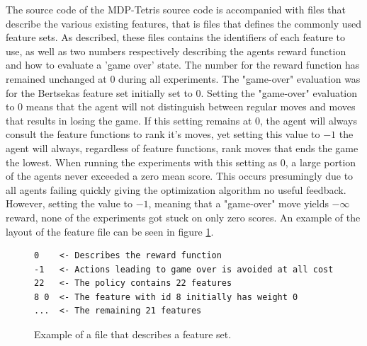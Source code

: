 The source code of the MDP-Tetris source code 
is accompanied with files that describe the
various existing features, that is files that defines 
the commonly used feature sets. As described, these files contains the identifiers of 
each feature to use, as well as two numbers respectively describing 
the agents reward function and how to evaluate a 'game over' state. 
The number for the reward function has remained unchanged at $0$ 
during all experiments. The "game-over" evaluation was for the
Bertsekas feature set initially set to $0$. Setting the 
"game-over" evaluation to $0$ means that the agent will not 
distinguish between regular moves and moves that results in losing
the game. If this setting remains at 0, the agent will always consult the
feature functions to rank it's moves, yet setting this value to $-1$
the agent will always, regardless of feature functions, rank moves that ends
the game the lowest.
When running the experiments with this setting as $0$, a large portion
of the agents never exceeded a zero mean score. This occurs presumingly 
due to all agents failing quickly giving the optimization algorithm no 
useful feedback. However, setting the value
to $-1$, meaning that a "game-over" move yields $-\infty$ reward, 
none of the experiments got stuck on only zero scores. An example
of the layout of the feature file can be seen in figure \ref{fig:featfile}.
\begin{figure}[H]
\centering
\begin{lstlisting}
0    <- Describes the reward function
-1   <- Actions leading to game over is avoided at all cost
22   <- The policy contains 22 features
8 0  <- The feature with id 8 initially has weight 0
...  <- The remaining 21 features
\end{lstlisting}
\caption{Example of a file that describes a feature set. \label{fig:featfile}}
\end{figure}

